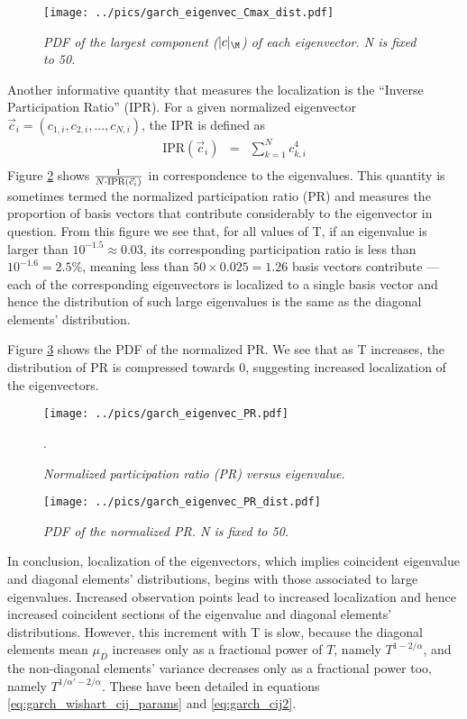 \begin{figure}[htb!]
  \centering
  \texttt{[image: ../pics/garch\_eigenvec\_Cmax\_dist.pdf]}
  \caption{\small \it PDF of the largest component ($|c|_\M$) of
    each eigenvector. N is fixed to 50.}
  \label{fig:garch_eigenvec_Cmax_dist}
\end{figure}

Another informative quantity that measures the localization is the
``Inverse Participation Ratio'' (IPR). For a given normalized eigenvector
$\vec{c}_i = (c_{1, i}, c_{2, i}, ..., c_{N, i})$, the IPR is defined
as \cite{Aberg2013}
\begin{eqnarray*}
  \text{IPR}(\vec{c}_i) &=& \sum_{k=1}^N c_{k,i}^4 \\
\end{eqnarray*}
Figure \ref{fig:garch_eigenvec_PR} shows ${1 \over
  N \cdot \text{IPR}(\vec{c}_i)}$ in correspondence to the
eigenvalues. This quantity is sometimes termed the
normalized participation ratio (PR) and measures the proportion of
basis vectors that contribute considerably to the eigenvector in
question. From this figure we see that, for all values of T, if an
eigenvalue is larger than $10^{-1.5} \approx 0.03$, its corresponding
participation ratio is less than $10^{-1.6} = 2.5\%$, meaning less
than $50 \times 0.025 = 1.26$ basis vectors contribute --- each of the
corresponding eigenvectors is localized to a single basis vector and
hence the distribution of such large eigenvalues is the same as the
diagonal elements' distribution.

Figure \ref{fig:garch_eigenvec_PR_dist} shows the PDF of the
normalized PR. We see that as T increases, the distribution of PR is
compressed towards 0, suggesting increased localization of the
eigenvectors.
\begin{figure}[htb!]
  \centering
  \texttt{[image: ../pics/garch\_eigenvec\_PR.pdf]}
  \caption{\small \it Normalized participation ratio (PR)
    versus eigenvalue.}.
  \label{fig:garch_eigenvec_PR}
\end{figure}

\begin{figure}[htb!]
  \centering
  \texttt{[image: ../pics/garch\_eigenvec\_PR\_dist.pdf]}
  \caption{\small \it PDF of the normalized PR. N is fixed to
    50.}
  \label{fig:garch_eigenvec_PR_dist}
\end{figure}
In conclusion, localization of the eigenvectors, which implies 
coincident eigenvalue and diagonal elements' distributions, begins with
those associated to large eigenvalues. Increased observation points
lead to increased localization and hence increased coincident sections
of the eigenvalue and diagonal elements' distributions. However, this
increment with T is slow, because the diagonal elements mean $\mu_D$
increases only as a fractional power of $T$, namely $T^{1 -
  2/\alpha}$, and the non-diagonal elements' variance decreases only
as a fractional power too, namely $T^{1/\alpha' - 2/\alpha}$. These
have been detailed in equations \ref{eq:garch_wishart_cij_params} and
\ref{eq:garch_cij2}.

